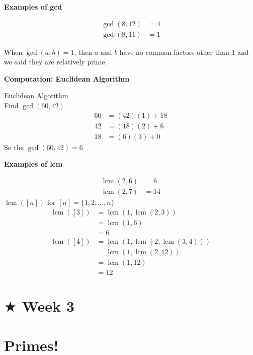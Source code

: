 \documentclass{article}
\DeclareMathOperator*{\lcm}{lcm}
\begin{document}
    \begin{adjustwidth}{40pt}{40pt}
    \centerline{\textbf{Examples of gcd}}
    \begin{align*}
        \gcd(8,12)&=4\\
        \gcd(8,11)&=1
    \end{align*}

    When \(\gcd(a,b)=1\), then \(a\) and \(b\) have no common factors other than 1 and we said they are relatively prime.
    \end{adjustwidth}

\vspace{0.5cm}
    \begin{adjustwidth}{40pt}{40pt}
    \centerline{\textbf{Computation: Euclidean Algorithm}} Euclidean Algorithm\\
    Find \(\gcd(60,42)\)
    \begin{align*}
        60&=(42)(1)+18\\
        42&=(18)(2)+6\\
        18&=(6)(3)+0
    \end{align*}
    So the \(\gcd(60,42)=6\)
    \end{adjustwidth}
\vspace{0.5cm}

    \begin{adjustwidth}{40pt}{40pt}
    \centerline{\textbf{Examples of lcm}}
    \begin{align*}
        \lcm(2,6)&=6\\
        \lcm(2,7)&=14
    \end{align*}
    \(\lcm([n])\) for \([n]=\{1,2,\dots, n\}\)
    \begin{align*}
        \lcm([3])&=\lcm(1,\lcm(2,3))\\
        &=\lcm(1,6)\\
        &=6\\
        \lcm([4])&=\lcm(1,\lcm(2,\lcm(3,4)))\\
        &=\lcm(1,\lcm(2,12))\\
        &=\lcm(1,12)\\
        &=12
    \end{align*}
    \end{adjustwidth}

\newpage
\section*{$\bigstar$ Week 3}
\section*{Primes!}
\end{document}
